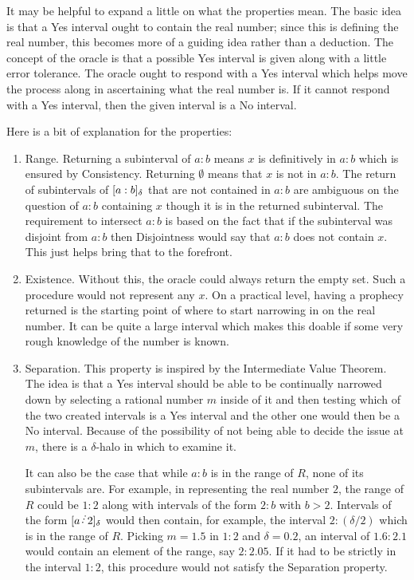 \documentclass[12pt]{article}
\begin{document}
It may be helpful to expand a little on what the properties mean. The basic idea is that a Yes interval ought to contain the real number; since this is defining the real number, this becomes more of a guiding idea rather than a deduction. The concept of the oracle is that a possible Yes interval is given along with a little error tolerance. The oracle ought to respond with a Yes interval which helps move the process along in ascertaining what the real number is. If it cannot respond with a Yes interval, then the given interval is a No interval. 

Here is a bit of explanation for the properties:
\begin{enumerate}
    \item Range. Returning a subinterval of $a:b$ means $x$ is definitively in $a:b$ which is ensured by Consistency. Returning $\emptyset$ means that $x$ is not in $a:b$. The return of subintervals of $[a:b]_{\delta}$ that are not contained in $a:b$ are ambiguous on the question of $a:b$ containing $x$ though it is in the returned subinterval. The requirement to intersect $a:b$ is based on the fact that if the subinterval was disjoint from $a:b$ then Disjointness would say that $a:b$ does not contain $x$. This just helps bring that to the forefront. 
    
    \item Existence. Without this, the oracle could always return the empty set. Such a procedure would not represent any $x$. On a practical level, having a prophecy returned is the starting point of where to start narrowing in on the real number. It can be quite a large interval which makes this doable if some very rough knowledge of the number is known. 
    
    \item Separation. This property is inspired by the Intermediate Value Theorem. The idea is that a Yes interval should be able to be continually narrowed down by selecting a rational number $m$ inside of it and then testing which of the two created intervals is a Yes interval and the other one would then be a No interval. Because of the possibility of not being able to decide the issue at $m$, there is a $\delta$-halo in which to examine it. 
    
    It can also be the case that while $a:b$ is in the range of $R$, none of its subintervals are. For example, in representing the real number $2$, the range of $R$ could be $1:2$ along with intervals of the form $2:b$ with $b >2$. Intervals of the form $\halo{a\lte 2}$ would then contain, for example, the interval $2:(\delta/2)$ which is in the range of $R$. Picking $m=1.5$ in $1:2$ and $\delta = 0.2$, an interval of $1.6:2.1$ would contain an element of the range, say $2:2.05$. If it had to be strictly in the interval $1:2$, this procedure would not satisfy the Separation property. 


\end{enumerate}
\end{document}
